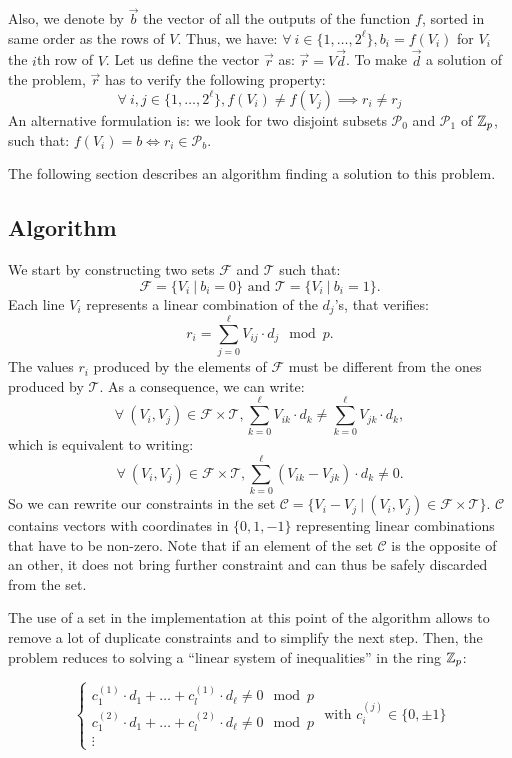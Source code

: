 Also, we denote by $\Vec{b}$ the vector of all the outputs of the function $f$, sorted in same order as the rows of $V$. Thus, we have: $\forall~i \in \{1, \dots, 2^\ell\}, b_i = f(V_i)$
for $V_i$ the $i$th row of $V$. Let us define the vector $\vec r$ as: $\Vec{r} = V \vec{d}$. To make $\vec d$ a solution of the problem, $\vec r$ has to verify the following property:
\[
\forall~i, j \in \{1, \dots, 2^\ell\}, f(V_i) \neq f(V_j) \implies r_i \neq r_j   
\]
An alternative formulation is: we look for two disjoint subsets $\mathcal{P}_0$ and $\mathcal{P}_1$ of $\mathbb{Z}_p$, such that: $f(V_i) = b \Longleftrightarrow r_i \in \mathcal P_b$.

The following section describes an algorithm finding a solution to this problem.

\subsection{Algorithm}
\label{sec:search_algorithm}

We start by constructing two sets $\mathcal F$ and $\mathcal T$ such that: \[\mathcal F = \{V_i ~\vert~ b_i = 0\} \text{ and } \mathcal T = \{V_i ~\vert~ b_i = 1\}.\]
Each line $V_i$ represents a linear combination of the $d_j$'s, that verifies:
\[r_i = \sum_{j=0}^{\ell} V_{ij} \cdot d_j \mod p.\]
The values $r_i$ produced by the elements of $\mathcal{F}$ must be different from the ones produced by $\mathcal{T}$. As a consequence, we can write:
\[\forall~(V_i, V_j) \in \mathcal F \times \mathcal T, \sum_{k=0}^\ell V_{ik} \cdot d_k \neq \sum_{k=0}^\ell V_{jk} \cdot d_k,\] which is equivalent to writing:
\[\forall~(V_i, V_j) \in \mathcal F \times \mathcal T, \sum_{k=0}^\ell (V_{ik} - V_{jk}) \cdot d_k \neq 0.\]
So we can rewrite our constraints in the set $\mathcal C =  \{V_i - V_j ~\vert~ (V_i, V_j) \in \mathcal F \times \mathcal T\}.$ $\mathcal{C}$ contains vectors with coordinates in $\{0, 1, -1\}$ representing linear combinations that have to be non-zero. Note that if an element of the set $\mathcal{C}$ is the opposite of an other, it does not bring further constraint and can thus be safely discarded from the set.

The use of a set in the implementation at this point of the algorithm allows to remove a lot of duplicate constraints and to simplify the next step. Then, the problem reduces to solving a ``linear system of inequalities'' in the ring $\mathbb{Z}_p$: 

$$
\begin{cases}
    c_1^{(1)} \cdot d_1 + \dots + c_l^{(1)} \cdot d_\ell \ne 0 \mod p \\
    c_1^{(2)} \cdot d_1 + \dots + c_l^{(2)} \cdot d_\ell \ne 0 \mod p\\
    \vdots
\end{cases} \text{ with }
c_i^{(j)} \in \{0, \pm 1\}
$$


